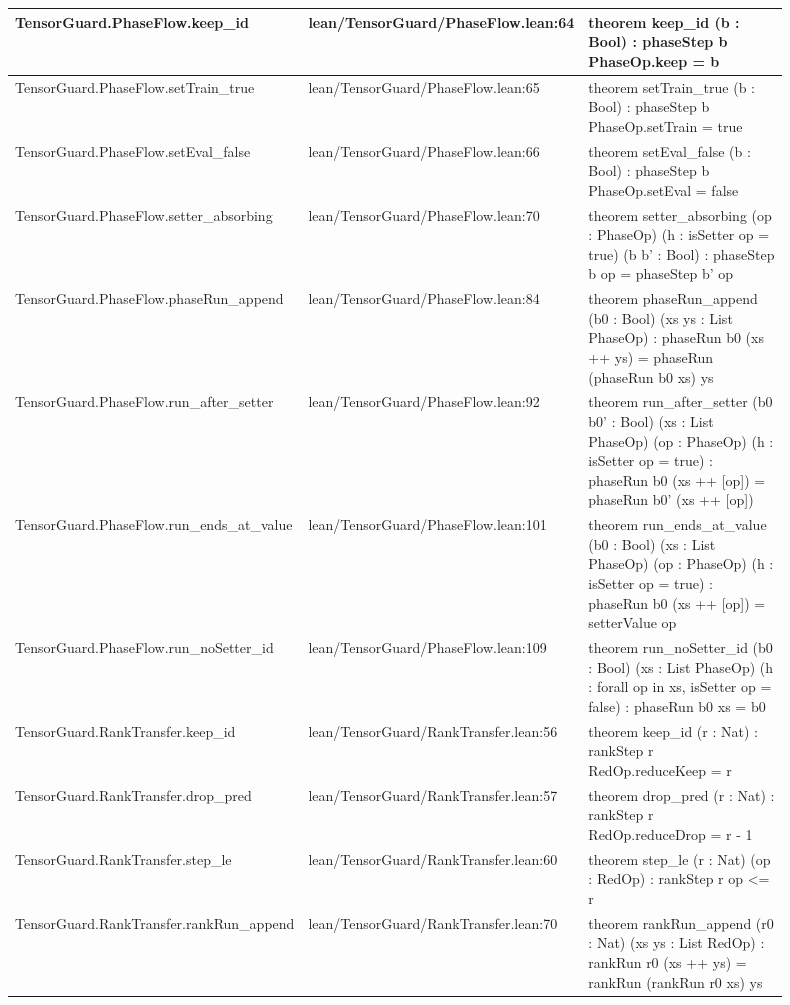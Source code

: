 \documentclass[10pt]{article}
\begin{document}
\begin{longtable}{|p{0.30\linewidth}|p{0.14\linewidth}|p{0.46\linewidth}|}
\hline
TensorGuard.PhaseFlow.keep\_id & lean/TensorGuard/PhaseFlow.lean:64 & theorem keep\_id (b : Bool) : phaseStep b PhaseOp.keep = b \\
\hline
TensorGuard.PhaseFlow.setTrain\_true & lean/TensorGuard/PhaseFlow.lean:65 & theorem setTrain\_true (b : Bool) : phaseStep b PhaseOp.setTrain = true \\
\hline
TensorGuard.PhaseFlow.setEval\_false & lean/TensorGuard/PhaseFlow.lean:66 & theorem setEval\_false (b : Bool) : phaseStep b PhaseOp.setEval = false \\
\hline
TensorGuard.PhaseFlow.setter\_absorbing & lean/TensorGuard/PhaseFlow.lean:70 & theorem setter\_absorbing (op : PhaseOp) (h : isSetter op = true) (b b' : Bool) : phaseStep b op = phaseStep b' op \\
\hline
TensorGuard.PhaseFlow.phaseRun\_append & lean/TensorGuard/PhaseFlow.lean:84 & theorem phaseRun\_append (b0 : Bool) (xs ys : List PhaseOp) : phaseRun b0 (xs ++ ys) = phaseRun (phaseRun b0 xs) ys \\
\hline
TensorGuard.PhaseFlow.run\_after\_setter & lean/TensorGuard/PhaseFlow.lean:92 & theorem run\_after\_setter (b0 b0' : Bool) (xs : List PhaseOp) (op : PhaseOp) (h : isSetter op = true) : phaseRun b0 (xs ++ [op]) = phaseRun b0' (xs ++ [op]) \\
\hline
TensorGuard.PhaseFlow.run\_ends\_at\_value & lean/TensorGuard/PhaseFlow.lean:101 & theorem run\_ends\_at\_value (b0 : Bool) (xs : List PhaseOp) (op : PhaseOp) (h : isSetter op = true) : phaseRun b0 (xs ++ [op]) = setterValue op \\
\hline
TensorGuard.PhaseFlow.run\_noSetter\_id & lean/TensorGuard/PhaseFlow.lean:109 & theorem run\_noSetter\_id (b0 : Bool) (xs : List PhaseOp) (h : forall op in xs, isSetter op = false) : phaseRun b0 xs = b0 \\
\hline
TensorGuard.RankTransfer.keep\_id & lean/TensorGuard/RankTransfer.lean:56 & theorem keep\_id (r : Nat) : rankStep r RedOp.reduceKeep = r \\
\hline
TensorGuard.RankTransfer.drop\_pred & lean/TensorGuard/RankTransfer.lean:57 & theorem drop\_pred (r : Nat) : rankStep r RedOp.reduceDrop = r - 1 \\
\hline
TensorGuard.RankTransfer.step\_le & lean/TensorGuard/RankTransfer.lean:60 & theorem step\_le (r : Nat) (op : RedOp) : rankStep r op <= r \\
\hline
TensorGuard.RankTransfer.rankRun\_append & lean/TensorGuard/RankTransfer.lean:70 & theorem rankRun\_append (r0 : Nat) (xs ys : List RedOp) : rankRun r0 (xs ++ ys) = rankRun (rankRun r0 xs) ys \\

\end{longtable}
\end{document}
